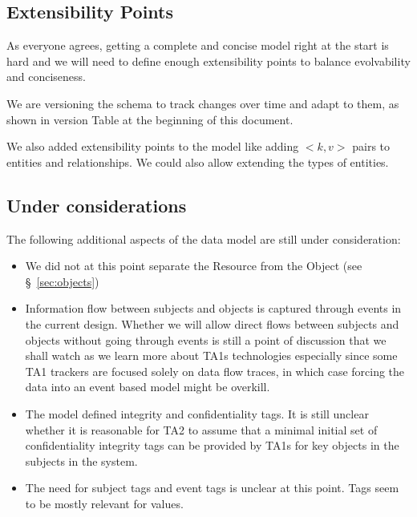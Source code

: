 \documentclass[10pt, conference, onecolumn]{IEEEtran}
\begin{document}
\subsection{Extensibility Points} 
As everyone agrees, getting a complete and concise model right at the start is hard and we will need to define enough extensibility points to balance evolvability and conciseness. 

We are versioning the schema to track changes over time and adapt to them, as shown in version Table at the beginning of this document.

We also added extensibility points to the model like adding $<k,v>$ pairs to entities and relationships. We could also allow extending the types of entities. 

\subsection{Under considerations} 
The following additional aspects of the data model are still under consideration:
\begin{itemize}
\item We did not at this point separate the Resource from the Object (see \S~\ref{sec:objects})
\item Information flow between subjects and objects is captured through events in the current design. Whether we will allow direct flows between subjects and objects without going through events is still a point of discussion that we shall watch as we learn more about TA1s technologies especially since some TA1 trackers are focused solely on data flow traces, in which case forcing the data into an event based model might be overkill.
\item The model defined integrity and confidentiality tags. It is still unclear whether it is reasonable for TA2 to assume that a minimal initial set of confidentiality integrity tags can be provided by TA1s for key objects in the subjects in the system.
\item The need for subject tags and event tags is unclear at this point. Tags seem to be mostly relevant for values.
\end{itemize}




\end{document}
